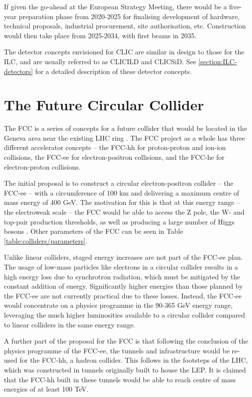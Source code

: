 If given the go-ahead at the European Strategy Meeting, there would be a five-year preparation phase from 2020-2025 for finalising development of hardware, technical proposals, industrial procurement, site authorisation, etc. Construction would then take place from 2025-2034, with first beams in 2035.

The detector concepts envisioned for \acrshort{CLIC} are similar in design to those for the \acrshort{ILC}, and are usually referred to as CLIC\textunderscore ILD and CLIC\textunderscore SiD. See \ref{section:ILC-detectors} for a detailed description of these detector concepts.

\section{The Future Circular Collider}
The \acrfull{FCC} is a series of concepts for a future collider that would be located in the Geneva area near the existing LHC ring \cite{fcc-cdr-engineering}. The \acrshort{FCC} project as a whole has three different accelerator concepts -- the FCC-hh for proton-proton and ion-ion collisions, the FCC-ee for electron-positron collisions, and the FCC-he for electron-proton collisions.

The initial proposal is to construct a circular electron-positron collider -- the FCC-ee -- with a circumference of 100 km and delivering a maximum centre of mass energy of 400 GeV. The motivation for this is that at this energy range -- the electroweak scale -- the \acrshort{FCC} would be able to access the Z pole, the W- and top-pair production thresholds, as well as producing a large number of Higgs bosons \cite{fcc-cdr-physics}. Other parameters of the \acrshort{FCC} can be seen in Table \ref{table:colliders/parameters}.

Unlike linear colliders, staged energy increases are not part of the FCC-ee plan. The usage of low-mass particles like electrons in a circular collider results in a high energy loss due to synchrotron radiation, which must be mitigated by the constant addition of energy. Significantly higher energies than those planned by the FCC-ee are not currently practical due to these losses. Instead, the FCC-ee would concentrate on a physics programme in the 90-365 GeV energy range, leveraging the much higher luminosities available to a circular collider compared to linear colliders in the same energy range.

A further part of the proposal for the \acrshort{FCC} is that following the conclusion of the physics programme of the FCC-ee, the tunnels and infrastructure would be re-used for the FCC-hh, a hadron collider. This follows in the footsteps of the \acrshort{LHC}, which was constructed in tunnels originally built to house the \acrfull{LEP}. It is claimed that the FCC-hh built in these tunnels would be able to reach centre of mass energies of at least 100 TeV.

